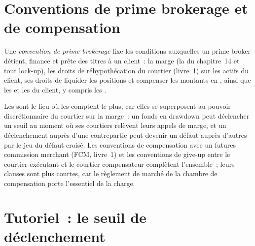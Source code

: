 \label{lst:fm:legal-documentation:annex}

\section{Conventions de prime brokerage et de compensation}

\begin{definition}\label{def:fm:legal-documentation:pba}
Une \emph{convention de prime brokerage} fixe les conditions auxquelles un prime broker détient, finance et prête des titres à un
client~: la marge (la  du chapitre~14 et tout lock-up), les droits de réhypothécation du courtier (livre~1) sur les actifs du client, ses droits de
liquider les positions et compenser les montants en , ainsi que les  et les  du client, y compris les .
\end{definition}

Les  sont le lieu où les  comptent le plus, car elles se superposent au pouvoir discrétionnaire du courtier sur la marge~: un fonds en drawdown
peut déclencher un seuil au moment où ses courtiers relèvent leurs appels de marge, et un déclenchement auprès d'une contrepartie peut devenir un défaut auprès d'autres par le jeu du défaut croisé.
Les conventions de compensation avec un futures commission merchant (FCM, livre~1) et les conventions de give-up entre le courtier exécutant et le courtier compensateur complètent l'ensemble~;
leurs clauses sont plus courtes, car le règlement de marché de la chambre de compensation porte l'essentiel de la charge.

\section{Tutoriel~: le seuil de déclenchement}\label{tut:fm:legal-documentation:tut}

